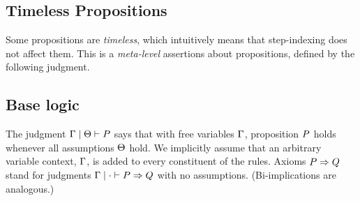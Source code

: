
\subsection{Timeless Propositions}

Some propositions are \emph{timeless}, which intuitively means that step-indexing does not affect them.
This is a \emph{meta-level} assertions about propositions, defined by the following judgment.



\subsection{Base logic}

The judgment $\Gamma \mid \Theta \vdash P$ says that with free variables $\Gamma$, proposition $P$ holds whenever all assumptions $\Theta$ hold.
We implicitly assume that an arbitrary variable context, $\Gamma$, is added to every constituent of the rules.
Axioms $P \Rightarrow Q$ stand for judgments $\Gamma \mid \cdot \vdash P \Rightarrow Q$ with no assumptions.
(Bi-implications are analogous.)

